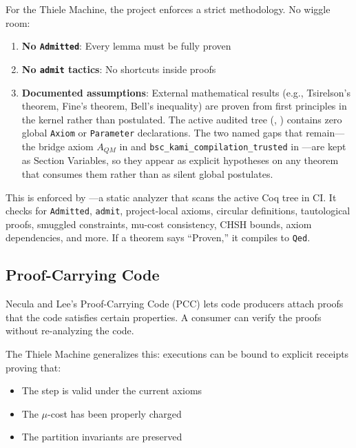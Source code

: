 For the Thiele Machine, the project enforces a strict methodology. No wiggle room:

\begin{enumerate}
    \item \textbf{No \texttt{Admitted}}: Every lemma must be fully proven
    \item \textbf{No \texttt{admit} tactics}: No shortcuts inside proofs
    \item \textbf{Documented assumptions}: External mathematical results (e.g., Tsirelson's theorem, Fine's theorem, Bell's inequality) are proven from first principles in the kernel rather than postulated. The active audited tree (, ) contains zero global \texttt{Axiom} or \texttt{Parameter} declarations. The two named gaps that remain---the bridge axiom $A_{QM}$ in  and \texttt{bsc\_kami\_compilation\_trusted} in ---are kept as Section Variables, so they appear as explicit hypotheses on any theorem that consumes them rather than as silent global postulates.
\end{enumerate}

This is enforced by ---a static analyzer that scans the active Coq tree in CI. It checks for \texttt{Admitted}, \texttt{admit}, project-local axioms, circular definitions, tautological proofs, smuggled constraints, mu-cost consistency, CHSH bounds, axiom dependencies, and more. If a theorem says ``Proven,'' it compiles to \texttt{Qed}.

\subsection{Proof-Carrying Code}

Necula and Lee's Proof-Carrying Code (PCC) \cite{necula1997proof} lets code producers attach proofs that the code satisfies certain properties. A consumer can verify the proofs without re-analyzing the code.

The Thiele Machine generalizes this: executions can be bound to explicit receipts proving that:
\begin{itemize}
    \item The step is valid under the current axioms
    \item The $\mu$-cost has been properly charged
    \item The partition invariants are preserved
\end{itemize}

